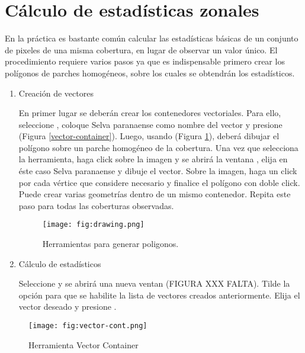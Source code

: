 \section{Cálculo de estadísticas zonales}

En la práctica es bastante común calcular las estadísticas básicas de un conjunto de pixeles de una misma cobertura, en lugar de observar un valor único. El procedimiento requiere varios pasos ya que es indispensable primero crear los polígonos de parches homogéneos, sobre los cuales se obtendrán los estadísticos.
\begin{enumerate}
	\item Creación de vectores

	En primer lugar se deberán crear los contenedores vectoriales. Para ello, seleccione , coloque Selva paranaense como nombre del vector y presione  (Figura \ref{vector-container}). Luego, usando   (Figura \ref{fig:drawing}), deberá dibujar el polígono sobre un parche homogéneo de la cobertura. Una vez que selecciona la herramienta, haga click sobre la imagen y se abrirá la ventana , elija en éste caso Selva paranaense y dibuje el vector. Sobre la imagen, haga un click por cada vértice que considere necesario y finalice el polígono con doble click. Puede crear varias geometrías dentro de un mismo contenedor. Repita este paso para todas las coberturas observadas.

  \begin{figure}[H]
      \centering
      \texttt{[image: fig:drawing.png]}
      \caption{Herramientas para generar poligonos.}
      \label{fig:drawing}
  \end{figure}

	\item Cálculo de estadísticos

	Seleccione  y se abrirá una nueva ventan (FIGURA  XXX FALTA). Tilde la opción  para que se habilite la lista de vectores creados anteriormente. Elija el vector deseado y presione .
\end{enumerate}



\begin{figure}[h!]
    \centering
    \texttt{[image: fig:vector-cont.png]}
    \caption{Herramienta Vector Container}
    \label{fig:vector-container}
\end{figure}



